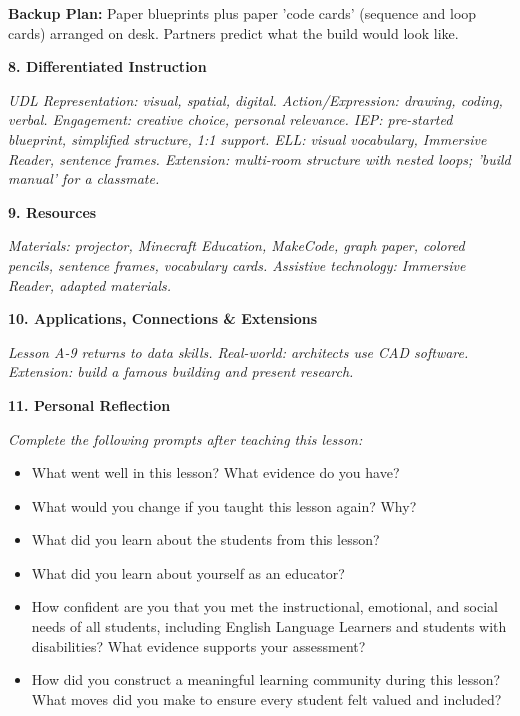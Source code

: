 \documentclass[11pt,letterpaper]{article}
\begin{document}
\textbf{Backup Plan: }Paper blueprints plus paper 'code cards' (sequence and loop cards) arranged on desk. Partners predict what the build would look like.

\textbf{8. Differentiated Instruction}

\textit{UDL Representation: visual, spatial, digital. Action/Expression: drawing, coding, verbal. Engagement: creative choice, personal relevance. IEP: pre-started blueprint, simplified structure, 1:1 support. ELL: visual vocabulary, Immersive Reader, sentence frames. Extension: multi-room structure with nested loops; 'build manual' for a classmate.}

\textbf{9. Resources}

\textit{Materials: projector, Minecraft Education, MakeCode, graph paper, colored pencils, sentence frames, vocabulary cards. Assistive technology: Immersive Reader, adapted materials.}

\textbf{10. Applications, Connections \& Extensions}

\textit{Lesson A-9 returns to data skills. Real-world: architects use CAD software. Extension: build a famous building and present research.}

\textbf{11. Personal Reflection}

\textit{Complete the following prompts after teaching this lesson:}

\begin{itemize}
  \item What went well in this lesson? What evidence do you have?

  \item What would you change if you taught this lesson again? Why?

  \item What did you learn about the students from this lesson?

  \item What did you learn about yourself as an educator?

  \item How confident are you that you met the instructional, emotional, and social needs of all students, including English Language Learners and students with disabilities? What evidence supports your assessment?

  \item How did you construct a meaningful learning community during this lesson? What moves did you make to ensure every student felt valued and included?
\end{itemize}
\end{document}
